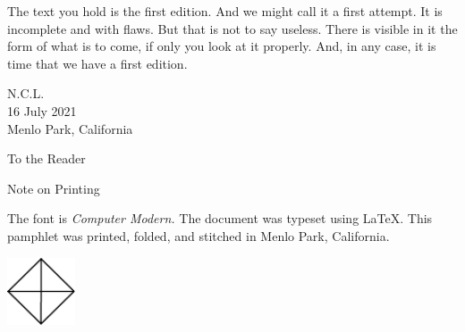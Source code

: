 The text you hold is the first edition.
And we might call it a first attempt.
It is incomplete and with flaws.
But that is not to say useless.
There is visible in it the form of what is to come, if only you look at it properly.
And, in any case, it is time that we have a first edition.

\begin{flushright}
N.C.L. \\
16 July 2021 \\
Menlo Park, California \\
\end{flushright}

\clearpage

\begin{center}
\vspace*{-1.5cm}
  \sf To the Reader
\end{center}



\clearpage

\tableofcontents

\clearpage




\clearpage

%
%

\blankpage

\begin{center}
\vspace*{-1.5cm}
  \sf Note on Printing
\end{center}
\noindent\noindent The font is \textit{Computer Modern.}
The document was typeset using \LaTeX.
This pamphlet was printed, folded, and stitched in Menlo Park, California.

\clearpage
\vspace*{\fill}
\begin{center}
\includegraphics[width=0.15\textwidth]{../trademark}
\end{center}
\vspace{\fill}
\thispagestyle{empty}


